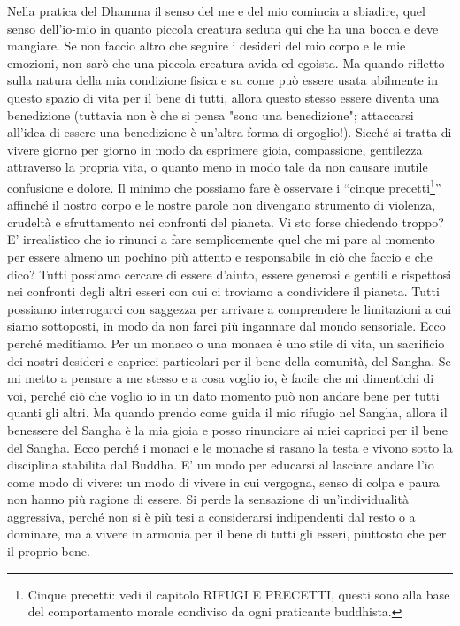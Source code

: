 Nella pratica del Dhamma il senso del me e del mio comincia a sbiadire,
quel senso dell'io-mio in quanto piccola creatura seduta qui che ha una
bocca e deve mangiare. Se non faccio altro che seguire i desideri del
mio corpo e le mie emozioni, non sarò che una piccola creatura avida ed
egoista. Ma quando rifletto sulla natura della mia condizione fisica e
su come può essere usata abilmente in questo spazio di vita per il bene
di tutti, allora questo stesso essere diventa una benedizione (tuttavia
non è che si pensa "sono una benedizione"; attaccarsi all'idea di essere
una benedizione è un'altra forma di orgoglio!). Sicché si tratta di
vivere giorno per giorno in modo da esprimere gioia, compassione,
gentilezza attraverso la propria vita, o quanto meno in modo tale da non
causare inutile confusione e dolore. Il minimo che possiamo fare è
osservare i “cinque precetti\footnote{Cinque precetti: vedi il capitolo RIFUGI E PRECETTI,
questi sono alla base del comportamento morale condiviso da ogni
praticante buddhista.}” affinché il nostro corpo e le
nostre parole non divengano strumento di violenza, crudeltà e
sfruttamento nei confronti del pianeta. Vi sto forse chiedendo troppo?
E' irrealistico che io rinunci a fare semplicemente quel che mi pare al
momento per essere almeno un pochino più attento e responsabile in ciò
che faccio e che dico? Tutti possiamo cercare di essere d'aiuto, essere
generosi e gentili e rispettosi nei confronti degli altri esseri con cui
ci troviamo a condividere il pianeta. Tutti possiamo interrogarci con
saggezza per arrivare a comprendere le limitazioni a cui siamo
sottoposti, in modo da non farci più ingannare dal mondo sensoriale.
Ecco perché meditiamo. Per un monaco o una monaca è uno stile di vita,
un sacrificio dei nostri desideri e capricci particolari per il bene
della comunità, del Sangha.
Se mi metto a pensare a me stesso e a cosa voglio io, è facile che mi
dimentichi di voi, perché ciò che voglio io in un dato momento può non
andare bene per tutti quanti gli altri. Ma quando prendo come guida il
mio rifugio nel Sangha, allora il benessere del Sangha è la mia gioia e
posso rinunciare ai miei capricci per il bene del Sangha. Ecco perché i
monaci e le monache si rasano la testa e vivono sotto la disciplina
stabilita dal Buddha. E' un modo per educarsi al lasciare andare l'io
come modo di vivere: un modo di vivere in cui vergogna, senso di colpa e
paura non hanno più ragione di essere. Si perde la sensazione di
un'individualità aggressiva, perché non si è più tesi a considerarsi
indipendenti dal resto o a dominare, ma a vivere in armonia per il bene
di tutti gli esseri, piuttosto che per il proprio bene.


